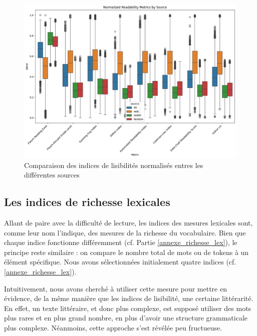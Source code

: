 \documentclass[12pt,a4paper,oneside,titlepage]{book} %
\begin{document}
	
	
	\begin{figure}
		\centering
		\includegraphics[scale=0.45]{illustration/boxplot_readability_V2.png}
		\caption{Comparaison des indices de lisibilités normalisés entres les différentes sources}
		\label{fig:comparaison_readability}
	\end{figure}
	
\pagebreak
	
	
	
	\subsection{Les indices de richesse lexicales}

Allant de paire avec la difficulté de lecture, les indices des mesures lexicales sont, comme leur nom l'indique, des mesures de la richesse du vocabulaire. Bien que chaque indice fonctionne différemment (cf. Partie \ref{annexe_richesse_lex}), le principe reste similaire : on compare le nombre total de mots ou de tokens à un élément spécifique. Nous avons sélectionnées initialement quatre indices (cf. \ref{annexe_richesse_lex}).

Intuitivement, nous avons cherché à utiliser cette mesure pour mettre en évidence, de la même manière que les indices de lisibilité, une certaine littérarité. En effet, un texte littéraire, et donc plus complexe, est supposé utiliser des mots plus rares et en plus grand nombre, en plus d'avoir une structure grammaticale plus complexe. Néanmoins, cette approche s'est révélée peu fructueuse. 
\end{document}
